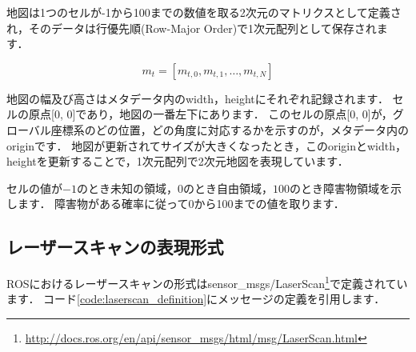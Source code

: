 \documentclass[{../../master}]{subfiles}
\begin{document}
地図は1つのセルが-1から100までの数値を取る2次元のマトリクスとして定義され，そのデータは行優先順(Row-Major Order)で1次元配列として保存されます．

\begin{equation}
  m_{t} = [m_{t, 0}, m_{t, 1},  \ldots, m_{t, N}]
\end{equation}

地図の幅及び高さはメタデータ内の\textsf{width}，\textsf{height}にそれぞれ記録されます．
セルの原点[0, 0]であり，地図の一番左下にあります．
このセルの原点[0, 0]が，グローバル座標系のどの位置，どの角度に対応するかを示すのが，メタデータ内の\textsf{origin}です．
地図が更新されてサイズが大きくなったとき，この\textsf{origin}と\textsf{width}，\textsf{height}を更新することで，1次元配列で2次元地図を表現しています．

セルの値が$-1$のとき未知の領域，$0$のとき自由領域，$100$のとき障害物領域を示します．
障害物がある確率に従って0から100までの値を取ります．

\subsection{レーザースキャンの表現形式}

ROSにおけるレーザースキャンの形式は\textsf{sensor\_msgs/LaserScan}\footnote{\url{http://docs.ros.org/en/api/sensor_msgs/html/msg/LaserScan.html}}で定義されています．
コード\ref{code:laserscan_definition}にメッセージの定義を引用します．
\end{document}
